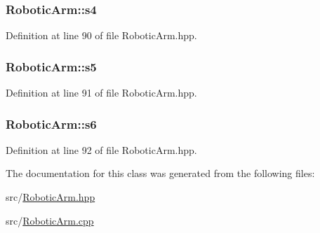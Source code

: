 \subsubsection[{\texorpdfstring{s4}{s4}}]{ Robotic\+Arm\+::s4}\hypertarget{class_robotic_arm_af0d9eb18ff10b252b79c8a986fe31170}{}\label{class_robotic_arm_af0d9eb18ff10b252b79c8a986fe31170}


Definition at line 90 of file Robotic\+Arm.\+hpp.

\subsubsection[{\texorpdfstring{s5}{s5}}]{ Robotic\+Arm\+::s5}\hypertarget{class_robotic_arm_a393711dcc74eb1fba3f9e544cd2bb771}{}\label{class_robotic_arm_a393711dcc74eb1fba3f9e544cd2bb771}


Definition at line 91 of file Robotic\+Arm.\+hpp.

\subsubsection[{\texorpdfstring{s6}{s6}}]{ Robotic\+Arm\+::s6}\hypertarget{class_robotic_arm_a4816473ed62d262e2a29590769e82f10}{}\label{class_robotic_arm_a4816473ed62d262e2a29590769e82f10}


Definition at line 92 of file Robotic\+Arm.\+hpp.



The documentation for this class was generated from the following files\+:\begin{DoxyCompactItemize}
\item 
src/\hyperlink{_robotic_arm_8hpp}{Robotic\+Arm.\+hpp}\item 
src/\hyperlink{_robotic_arm_8cpp}{Robotic\+Arm.\+cpp}\end{DoxyCompactItemize}
